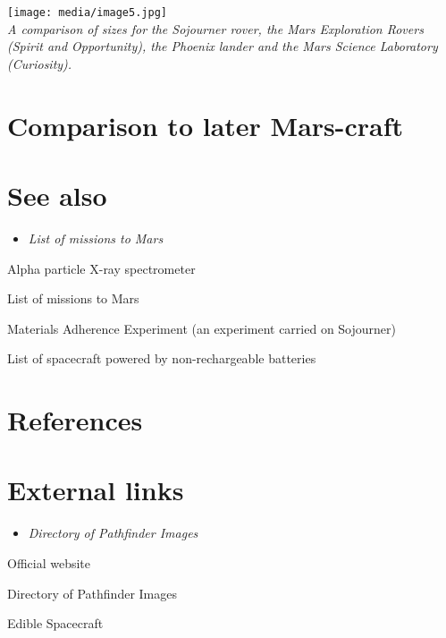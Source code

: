 \texttt{[image: media/image5.jpg]}\\
\emph{A comparison of sizes for the Sojourner rover, the Mars
Exploration Rovers (Spirit and Opportunity), the Phoenix lander and the
Mars Science Laboratory (Curiosity).}

\section{Comparison to later
Mars-craft}\label{comparison-to-later-mars-craft}

\section{See also}\label{see-also}

\begin{itemize}
\item
  \emph{List of missions to Mars}
\end{itemize}

Alpha particle X-ray spectrometer

List of missions to Mars

Materials Adherence Experiment (an experiment carried on Sojourner)

List of spacecraft powered by non-rechargeable batteries

\section{References}\label{references}

\section{External links}\label{external-links}

\begin{itemize}
\item
  \emph{Directory of Pathfinder Images}
\end{itemize}

Official website

Directory of Pathfinder Images

Edible Spacecraft
